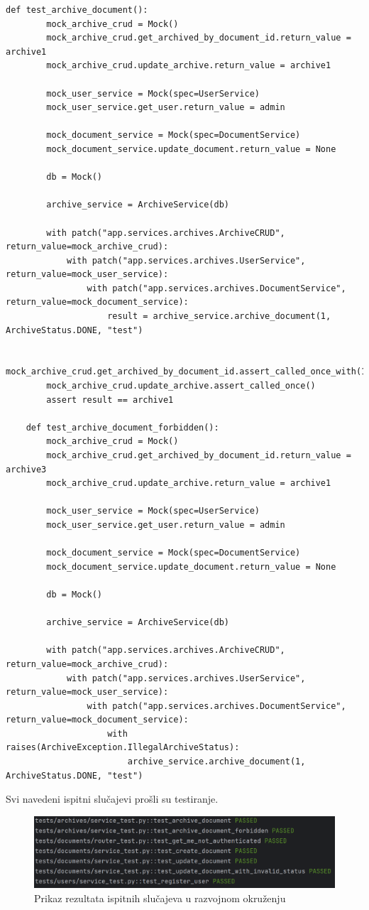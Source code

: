 \begin{lstlisting}[style=pythonstyle]
	def test_archive_document():
		mock_archive_crud = Mock()
		mock_archive_crud.get_archived_by_document_id.return_value = archive1
		mock_archive_crud.update_archive.return_value = archive1
		
		mock_user_service = Mock(spec=UserService)
		mock_user_service.get_user.return_value = admin
		
		mock_document_service = Mock(spec=DocumentService)
		mock_document_service.update_document.return_value = None
		
		db = Mock()
		
		archive_service = ArchiveService(db)
		
		with patch("app.services.archives.ArchiveCRUD", return_value=mock_archive_crud):
			with patch("app.services.archives.UserService", return_value=mock_user_service):
				with patch("app.services.archives.DocumentService", return_value=mock_document_service):
					result = archive_service.archive_document(1, ArchiveStatus.DONE, "test")
		
		mock_archive_crud.get_archived_by_document_id.assert_called_once_with(1)
		mock_archive_crud.update_archive.assert_called_once()
		assert result == archive1
		
	def test_archive_document_forbidden():
		mock_archive_crud = Mock()
		mock_archive_crud.get_archived_by_document_id.return_value = archive3
		mock_archive_crud.update_archive.return_value = archive1
		
		mock_user_service = Mock(spec=UserService)
		mock_user_service.get_user.return_value = admin
		
		mock_document_service = Mock(spec=DocumentService)
		mock_document_service.update_document.return_value = None
		
		db = Mock()
		
		archive_service = ArchiveService(db)
		
		with patch("app.services.archives.ArchiveCRUD", 	return_value=mock_archive_crud):
			with patch("app.services.archives.UserService", return_value=mock_user_service):
				with patch("app.services.archives.DocumentService", return_value=mock_document_service):
					with raises(ArchiveException.IllegalArchiveStatus):
						archive_service.archive_document(1, ArchiveStatus.DONE, "test")
\end{lstlisting}

			{Svi navedeni ispitni slučajevi prošli su testiranje.}

			\begin{figure}[H]
				\includegraphics[width=\textwidth]{slike/unitTestovi.png}
				\caption{Prikaz rezultata ispitnih slučajeva u razvojnom okruženju}
				\label{fig:rezultatiUnitTestova}
			\end{figure}		
			
